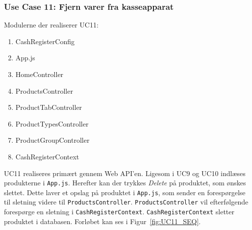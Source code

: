 \subsubsection{Use Case 11: Fjern varer fra kasseapparat}
Modulerne der realiserer UC11:
\begin{enumerate}
	\item CashRegisterConfig
	\item App.js
	\item HomeController
	\item ProductsController
	\item ProductTabController
	\item ProductTypesController
	\item ProductGroupController
	\item CashRegisterContext
\end{enumerate}
	
UC11 realiseres primært gennem Web API'en. Ligesom i UC9 og UC10 indlæses produkterne i \texttt{App.js}. Herefter kan der trykkes \textit{Delete} på produktet, som ønskes slettet. Dette laver et opslag på produktet i \texttt{App.js}, som sender en forespørgelse til sletning videre til \texttt{ProductsController}. \texttt{ProductsController} vil efterfølgende forespørge en sletning i \texttt{CashRegisterContext}. \texttt{CashRegisterContext} sletter produktet i databasen. Forløbet kan ses i Figur~\ref{fig:UC11_SEQ}.

